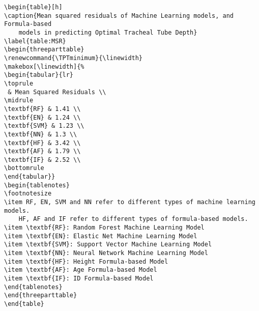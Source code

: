 \documentclass[11pt]{article}
\begin{document}
\begin{Verbatim}[tabsize=4]
\begin{table}[h]
\caption{Mean squared residuals of Machine Learning models, and Formula-based
	models in predicting Optimal Tracheal Tube Depth}
\label{table:MSR}
\begin{threeparttable}
\renewcommand{\TPTminimum}{\linewidth}
\makebox[\linewidth]{%
\begin{tabular}{lr}
\toprule
 & Mean Squared Residuals \\
\midrule
\textbf{RF} & 1.41 \\
\textbf{EN} & 1.24 \\
\textbf{SVM} & 1.23 \\
\textbf{NN} & 1.3 \\
\textbf{HF} & 3.42 \\
\textbf{AF} & 1.79 \\
\textbf{IF} & 2.52 \\
\bottomrule
\end{tabular}}
\begin{tablenotes}
\footnotesize
\item RF, EN, SVM and NN refer to different types of machine learning models.
	HF, AF and IF refer to different types of formula-based models.
\item \textbf{RF}: Random Forest Machine Learning Model
\item \textbf{EN}: Elastic Net Machine Learning Model
\item \textbf{SVM}: Support Vector Machine Learning Model
\item \textbf{NN}: Neural Network Machine Learning Model
\item \textbf{HF}: Height Formula-based Model
\item \textbf{AF}: Age Formula-based Model
\item \textbf{IF}: ID Formula-based Model
\end{tablenotes}
\end{threeparttable}
\end{table}

\end{Verbatim}
\end{document}
